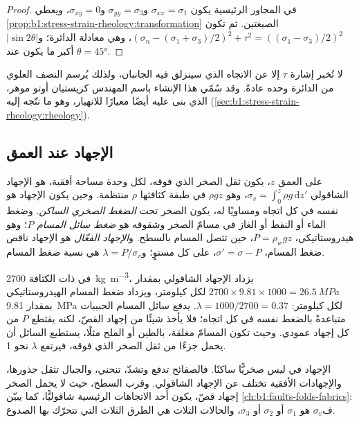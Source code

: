 \begin{proof}
في المحاور الرئيسية يكون $\sigma_{xx} = \sigma_1$ و$\sigma_{yy} = \sigma_3$ و$\sigma_{xy} = 0$، ويعطي \cref{prop:b1:stress-strain-rheology:transformation} الصيغتين. ثم تكون $(\sigma_n - (\sigma_1+\sigma_3)/2)^2 + \tau^2 = ((\sigma_1-\sigma_3)/2)^2$، وهي معادلة الدائرة؛ و$|\sin2\theta|$ أكبر ما يكون عند $\theta = \ang{45}$.
\end{proof}

لا تُخبر إشارة $\tau$ إلا عن الاتجاه الذي سينزلق فيه الجانبان، ولذلك يُرسم النصف العلوي من الدائرة وحده عادةً. وقد سُمّي هذا الإنشاء باسم المهندس كريستيان أوتو موهر، الذي بنى عليه أيضًا معيارًا للانهيار، وهو ما نتّجه إليه (\cref{sec:b1:stress-strain-rheology:rheology}).

\subsection*{الإجهاد عند العمق}

\begin{definition}\label{def:b1:stress-strain-rheology:lithostatic}
على العمق $z$، يكون ثقل الصخر الذي فوقه، لكل وحدة مساحة أفقية، هو الإجهاد الشاقولي $\sigma_v = \int_0^z\rho g\,\mathrm dz'$، وهو $\rho g z$ في طبقة كثافتها $\rho$ منتظمة. وحين يكون الإجهاد هو نفسه في كل اتجاه ومساويًا له، يكون الصخر تحت \emph{الضغط الصخري الساكن}. وضغط الماء أو النفط أو الغاز في مسامّ الصخر وشقوقه هو \emph{ضغط سائل المسام} $P$؛ وهو هيدروستاتيكي، $P = \rho_w g z$، حين تتصل المسام بالسطح. و\emph{الإجهاد الفعّال} هو الإجهاد ناقص ضغط المسام، $\sigma' = \sigma - P$، على كل مستوٍ؛ و$\lambda = P/\sigma_v$ هي نسبة ضغط المسام.
\end{definition}

في  ذات الكثافة \qty{2700}{kg.m^{-3}}، يزداد الإجهاد الشاقولي بمقدار $2700\times9.81\times1000 = \qty{26.5}{MPa}$ لكل كيلومتر، ويزداد ضغط المسام الهيدروستاتيكي بمقدار \qty{9.81}{MPa} لكل كيلومتر: $\lambda = 1000/2700 = 0.37$.
يدفع سائل المسام الحبيبات متباعدةً بالضغط نفسه في كل اتجاه؛ فلا يأخذ شيئًا من إجهاد القصّ، لكنه يقتطع $P$ من كل إجهاد عمودي. وحيث تكون المسامّ مغلقة، بالطين أو الملح مثلًا، يستطيع السائل أن يحمل جزءًا من ثقل الصخر الذي فوقه، فيرتفع $\lambda$ نحو 1.

الإجهاد في  ليس صخريًّا ساكنًا. فالصفائح تدفع وتشدّ،  تنحني، والجبال تثقل جذورها، والإجهادات الأفقية تختلف عن الإجهاد الشاقولي. وقرب السطح، حيث لا يحمل الصخر إجهاد قصّ، يكون أحد الاتجاهات الرئيسية شاقوليًّا، كما يبيّن \cref{ch:b1:faults-folds-fabrics}: ف$\sigma_v$ هو $\sigma_1$ أو $\sigma_2$ أو $\sigma_3$، والحالات الثلاث هي الطرق الثلاث التي تتحرّك بها الصدوع.

